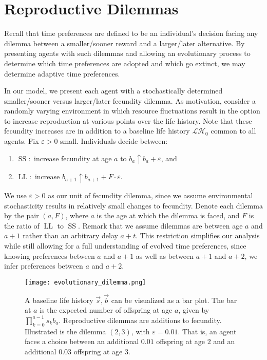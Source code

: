 \documentclass[titlepage, hidelinks, 12pt]{article}
\theoremstyle{plain}
\theoremstyle{remark}
\theoremstyle{definition}
\newcommand{\LH}{\mathcal{LH}}
\DeclareMathOperator{\smallersooner}{SS}
\DeclareMathOperator{\largerlater}{LL}
\begin{document}
\section{Reproductive Dilemmas}
Recall that time preferences are defined to be an individual's decision facing any dilemma between a smaller/sooner reward
and a larger/later alternative. By presenting agents with such dilemmas and allowing an evolutionary process to determine which
time preferences are adopted and which go extinct, we may determine adaptive time preferences. 

In our model, we present each agent with a stochastically determined
smaller/sooner versus larger/later fecundity dilemma.  As motivation, consider
a randomly varying environment in which resource fluctuations result in the option to
increase reproduction at various points over the life history. Note that these fecundity increases are in addition to a baseline life history
$\LH_0$ common to all agents.  
Fix $\varepsilon > 0$ small.  
Individuals decide between:
\begin{enumerate}
    \item $\smallersooner:$ increase fecundity at age $a$ to $b_a\uparrow b_{a} + \varepsilon$, and
    \item $\largerlater:$ increase $b_{a+1}\uparrow b_{a+1} + F\cdot \varepsilon$.
\end{enumerate}

We use $\varepsilon > 0$ as our unit of fecundity dilemma, since we assume environmental stochasticity results in relatively small changes to 
fecundity. 
Denote each dilemma by the pair $(a, F)$, where $a$ is the age at which the dilemma is faced,
and $F$ is the ratio of $\largerlater$ to $\smallersooner$. 
Remark that we assume dilemmas are between age $a$ and $a+1$ rather than an arbitrary delay $a+t$. This restriction simplifies our analysis
while still allowing for a full understanding of evolved time preferences, since knowing preferences between $a$ and $a+1$ as well as between
$a+1$ and $a+2$, we infer preferences between $a$ and $a+2$. 

\begin{figure}[H]
    \centering
    \texttt{[image: evolutionary\_dilemma.png]}
    \caption[Baseline life history and reproductive dilemma example.]{A baseline life history $\vec{s}, \vec{b}$ can be visualized as a bar plot. The bar at $a$ is the expected number of offspring at
        age $a$, given by
    $\prod_{k = 0}^{a-1} s_k b_a$. Reproductive dilemmas are additions to fecundity. Illustrated is the dilemma $(2, 3)$, with
$\varepsilon = 0.01$. That is, an agent faces a choice between an additional $0.01$ offspring at age $2$ and an additional $0.03$ offspring
at age $3$.} 
\end{figure}
\end{document}
